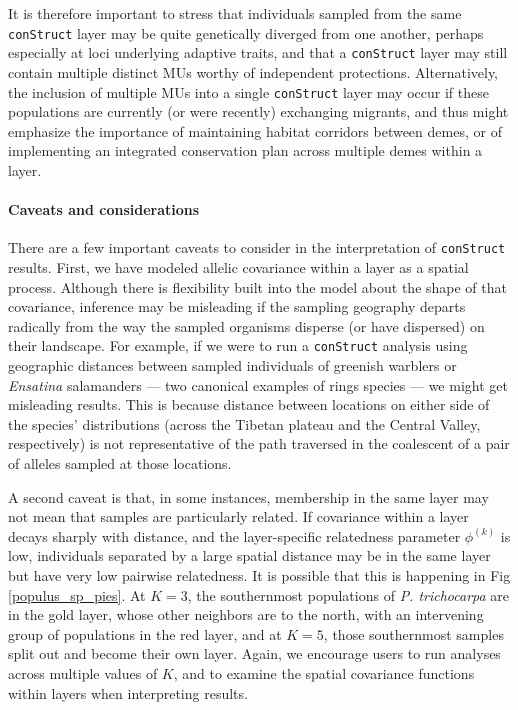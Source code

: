 \documentclass[10pt,letterpaper]{article}
\begin{document}
It is therefore important to stress that individuals sampled from the same \texttt{conStruct} layer 
may be quite genetically diverged from one another, 
perhaps especially at loci underlying adaptive traits, %
and that a \texttt{conStruct} layer may still contain multiple distinct MUs worthy of independent protections.  
Alternatively, the inclusion of multiple MUs into a single \texttt{conStruct} layer 
may occur if these populations are currently 
(or were recently) exchanging migrants, 
and thus might emphasize the importance of maintaining habitat corridors between demes, 
or of implementing an integrated conservation plan across multiple demes within a layer.

\paragraph{Caveats and considerations}
There are a few important caveats to consider in the interpretation of \texttt{conStruct} results. 
First, we have modeled allelic covariance within a layer as a spatial process.
Although there is flexibility built into the model about the shape of that covariance, 
inference may be misleading if the sampling geography departs radically from the way 
the sampled organisms disperse (or have dispersed) on their landscape.
For example, if we were to run a \texttt{conStruct} analysis using geographic distances between 
sampled individuals of greenish warblers \cite{Irwin2001} or \textit{Ensatina} salamanders \cite{wake_schneider1998} 
--- two canonical examples of rings species --- 
we might get misleading results.
This is because distance between locations on either side of the species' distributions
(across the Tibetan plateau and the Central Valley, respectively) 
is not representative of the path traversed in the coalescent of a pair of alleles sampled at those locations.

A second caveat is that, in some instances, 
membership in the same layer may not mean that samples are particularly related.
If covariance within a layer decays sharply with distance, 
and the layer-specific relatedness parameter $\phi^{(k)}$ is low, 
individuals separated by a large spatial distance may be in the same layer but have very low pairwise relatedness.
It is possible that this is happening in Fig \ref{populus_sp_pies}. 
At $K=3$, the southernmost populations of \textit{P. trichocarpa} are in the gold layer, 
whose other neighbors are to the north, with an intervening group of populations in the red layer, 
and at $K=5$, those southernmost samples split out and become their own layer.
Again, we encourage users to run analyses across multiple values of $K$, 
and to examine the spatial covariance functions within layers when interpreting results.
\end{document}
